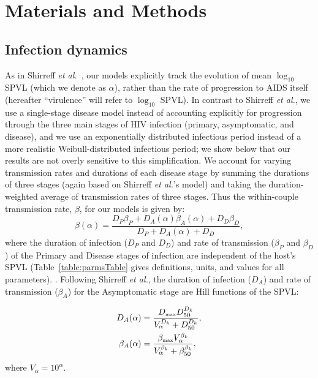 \documentclass[10pt,letterpaper]{article}
\newcommand{\Lspvl}{$\log_{10}$ SPVL}
\newcommand{\etal}{\textit{et al.}}
\newcommand{\tsub}[2]{#1_{{\textrm{\tiny #2}}}}
\begin{document}
\section*{Materials and Methods}

\subsection*{Infection dynamics}

As in Shirreff \etal\ \cite{shirreff_transmission_2011}, our models
explicitly track the evolution of mean $\log_{10}$ SPVL
(which we denote as $\alpha$), rather than the rate of progression to
AIDS itself (hereafter ``virulence'' will refer to \Lspvl).  
In contrast to Shirreff \etal, we use a
single-stage disease model instead of accounting explicitly for
progression through the three main stages of HIV infection (primary,
asymptomatic, and disease), and we use an exponentially
distributed infectious period instead of a more realistic
Weibull-distributed infectious period; we show below that our results
are not overly sensitive to this simplification. We account for
varying transmission rates and durations of each disease stage by
summing the durations of three stages (again based on Shirreff \etal's
model) and taking the duration-weighted average of transmission rates
of three stages. Thus the within-couple transmission rate, $\beta$,
for our models is given by:
\begin{equation}
\beta (\alpha) = \frac{D_P \beta_P + D_A (\alpha) \beta_A (\alpha) + D_D \beta_D}{D_P + D_A (\alpha) + D_D},
\end{equation}
where the duration of infection ($D_P$ and $D_D$) and rate of transmission ($\beta_P$ and $\beta_D$) of the Primary and Disease stages
of infection are independent of the host's SPVL
(Table~\ref{table:parmsTable} gives definitions, units, and values for all parameters).
. Following Shirreff \etal, the duration of infection ($D_A$) and rate of transmission ($\beta_A$) for the Asymptomatic stage are Hill functions of the SPVL:

\begin{equation}
\begin{split}
D_A(\alpha) &= \frac{\tsub{D}{max} D_{50} ^{D_k}}{V_\alpha ^{D_k} + D_{50}^{D_k}}, \\
\beta_A(\alpha) &= \frac{\tsub{\beta}{max} V_\alpha ^ {\beta_k}}%
{V_\alpha^{\beta_k} + \beta_{50} ^{\beta_k}},
\end{split}
\label{eq:hillfuns}
\end{equation}
where $V_{\alpha} = 10^\alpha$. 
\end{document}
